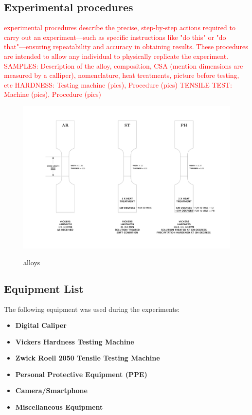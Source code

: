 \documentclass{article}
\begin{document}
\subsection{Experimental procedures}
\textcolor{red}{experimental procedures describe the precise, step-by-step actions required to carry out an experiment—such as specific instructions like "do this" or "do that"—ensuring repeatability and accuracy in obtaining results. These procedures are intended to allow any individual to physically replicate the experiment.\\
SAMPLES: Description of the alloy, composition, CSA (mention dimensions are measured by a calliper), nomenclature, heat treatments, picture before testing, etc
HARDNESS: Testing machine (pics), Procedure (pics)
TENSILE TEST: Machine (pics), Procedure (pics)}\\[8pt]
    
\begin{figure}[H]
    {\includegraphics[width=\textwidth]{images/alloys.png}}
    \caption{alloys}
    \label{fig:alloys}
\end{figure}


\subsection{Equipment List}
The following equipment was used during the experiments:
\begin{itemize}
    \item \textbf{Digital Caliper}
    \item \textbf{Vickers Hardness Testing Machine}
    \item \textbf{Zwick Roell 2050 Tensile Testing Machine}
    \item \textbf{Personal Protective Equipment (PPE)}
    \item \textbf{Camera/Smartphone}
    \item \textbf{Miscellaneous Equipment}
\end{itemize}
\end{document}
